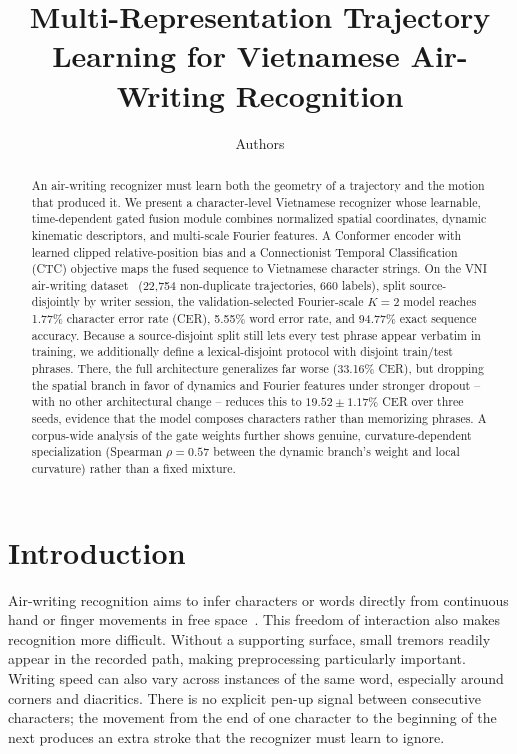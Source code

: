 \documentclass[runningheads]{llncs}
\title{Multi-Representation Trajectory Learning for Vietnamese Air-Writing Recognition}
\author{Authors}
\institute{Institution}
\begin{document}
\maketitle

\begin{abstract}
An air-writing recognizer must learn both the geometry of a trajectory and the motion that produced it. We present a character-level Vietnamese recognizer whose learnable, time-dependent gated fusion module combines normalized spatial coordinates, dynamic kinematic descriptors, and multi-scale Fourier features. A Conformer encoder with learned clipped relative-position bias and a Connectionist Temporal Classification (CTC) objective maps the fused sequence to Vietnamese character strings. On the VNI air-writing dataset~\cite{vni} (22,754 non-duplicate trajectories, 660 labels), split source-disjointly by writer session, the validation-selected Fourier-scale $K=2$ model reaches 1.77\% character error rate (CER), 5.55\% word error rate, and 94.77\% exact sequence accuracy. Because a source-disjoint split still lets every test phrase appear verbatim in training, we additionally define a lexical-disjoint protocol with disjoint train/test phrases. There, the full architecture generalizes far worse (33.16\% CER), but dropping the spatial branch in favor of dynamics and Fourier features under stronger dropout -- with no other architectural change -- reduces this to $19.52\pm1.17\%$ CER over three seeds, evidence that the model composes characters rather than memorizing phrases. A corpus-wide analysis of the gate weights further shows genuine, curvature-dependent specialization (Spearman $\rho=0.57$ between the dynamic branch's weight and local curvature) rather than a fixed mixture.
\end{abstract}

\section{Introduction}
Air-writing recognition aims to infer characters or words directly from continuous hand or finger movements in free space~\cite{alamdepth}. This freedom of interaction also makes recognition more difficult. Without a supporting surface, small tremors readily appear in the recorded path, making preprocessing particularly important. Writing speed can also vary across instances of the same word, especially around corners and diacritics. There is no explicit pen-up signal between consecutive characters; the movement from the end of one character to the beginning of the next produces an extra stroke that the recognizer must learn to ignore.
\end{document}
